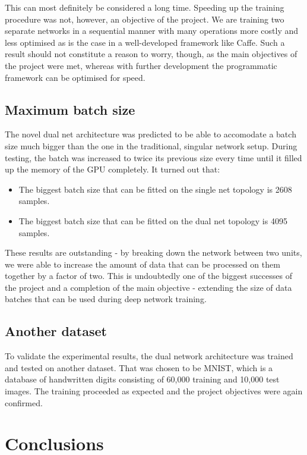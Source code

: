 \documentclass[a4paper, 12pt]{article}
\numberwithin{equation}{section}
\begin{document}
	This can most definitely be considered a long time. Speeding up the training procedure was not, however, an objective of the project. We are training two separate networks in a sequential manner with many operations more costly and less optimised as is the case in a well-developed framework like Caffe. Such a result should not constitute a reason to worry, though, as the main objectives of the project were met, whereas with further development the programmatic framework can be optimised for speed.
		
	\subsection{Maximum batch size}
	
	The novel dual net architecture was predicted to be able to accomodate a batch size much bigger than the one in the traditional, singular network setup. During testing, the batch was increased to twice its previous size every time until it filled up the memory of the GPU completely. It turned out that:
	\begin{itemize}
		\item The biggest batch size that can be fitted on the single net topology is 2608 samples.
		\item The biggest batch size that can be fitted on the dual net topology is 4095 samples.
	\end{itemize}
	
	These results are outstanding - by breaking down the network between two units, we were able to increase the amount of data that can be processed on them together by a factor of two. This is undoubtedly one of the biggest successes of the project and a completion of the main objective - extending the size of data batches that can be used during deep network training.
	
	\subsection{Another dataset}
	
	To validate the experimental results, the dual network architecture was trained and tested on another dataset. That was chosen to be MNIST, which is a database of handwritten digits consisting of 60,000 training and 10,000 test images. The training proceeded as expected and the project objectives were again confirmed.
	
	\section{Conclusions}
	
\end{document}
